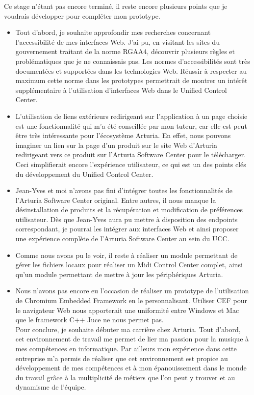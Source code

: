 \documentclass[francais]{rapportPFE}  %
\begin{document}
Ce stage n'étant pas encore terminé, il reste encore plusieurs points que je voudrais développer pour compléter mon prototype.
\begin{itemize}
    \item Tout d'abord, je souhaite approfondir mes recherches concernant l'accessibilité de mes interfaces Web. J'ai pu, en visitant les sites du gouvernement traitant de la norme RGAA4, découvrir plusieurs règles et problématiques que je ne connaissais pas. Les normes d'accessibilités sont très documentées et supportées dans les technologies Web. Réussir à respecter au maximum cette norme dans les prototypes permettrait de montrer un intérêt supplémentaire à l'utilisation d'interfaces Web dans le Unified Control Center.
    \item L'utilisation de liens extérieurs redirigeant sur l'application à un page choisie est une fonctionnalité qui m'a été conseillée par mon tuteur, car elle est peut être très intéressante pour l'écosystème Arturia. En effet, nous pouvons imaginer un lien sur la page d'un produit sur le site Web d'Arturia redirigeant vers ce produit sur l'Arturia Software Center pour le télécharger. Ceci simplifierait encore l'expérience utilisateur, ce qui est un des points clés du développement du Unified Control Center.
    \item Jean-Yves et moi n'avons pas fini d'intégrer toutes les fonctionnalités de l'Arturia Software Center original. Entre autres, il nous manque la désinstallation de produits et la récupération et modification de préférences utilisateur. Dès que Jean-Yves aura pu mettre à disposition des endpoints correspondant, je pourrai les intégrer aux interfaces Web et ainsi proposer une expérience complète de l'Arturia Software Center au sein du UCC.
    \item Comme nous avons pu le voir, il reste à réaliser un module permettant de gérer les fichiers locaux pour réaliser un Midi Control Center complet, ainsi qu'un module permettant de mettre à jour les périphériques Arturia.
    \item Nous n'avons pas encore eu l'occasion de réaliser un prototype de l'utilisation de Chromium Embedded Framework en le personnalisant. Utiliser CEF pour le navigateur Web nous apporterait une uniformité entre Windows et Mac que le framework C++ Juce ne nous permet pas.\\

Pour conclure, je souhaite débuter ma carrière chez Arturia. Tout d'abord, cet environnement de travail me permet de lier ma passion pour la musique à mes compétences en informatique. Par ailleurs mon expérience dans cette entreprise m'a permis de réaliser que cet environnement est propice au développement de mes compétences et à mon épanouissement dans le monde du travail grâce à la multiplicité de métiers que l'on peut y trouver et au dynamisme de l'équipe.
\end{itemize}
\end{document}
